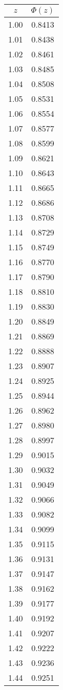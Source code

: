 \begin{tabular}{|c|c|}\hline
$z$ & $\Phi(z)$ \\ \hline
1.00 & 0.8413\\
1.01 & 0.8438\\
1.02 & 0.8461\\
1.03 & 0.8485\\
1.04 & 0.8508\\
1.05 & 0.8531\\
1.06 & 0.8554\\
1.07 & 0.8577\\
1.08 & 0.8599\\
1.09 & 0.8621\\
1.10 & 0.8643\\
1.11 & 0.8665\\
1.12 & 0.8686\\
1.13 & 0.8708\\
1.14 & 0.8729\\
1.15 & 0.8749\\
1.16 & 0.8770\\
1.17 & 0.8790\\
1.18 & 0.8810\\
1.19 & 0.8830\\
1.20 & 0.8849\\
1.21 & 0.8869\\
1.22 & 0.8888\\
1.23 & 0.8907\\
1.24 & 0.8925\\
1.25 & 0.8944\\
1.26 & 0.8962\\
1.27 & 0.8980\\
1.28 & 0.8997\\
1.29 & 0.9015\\
1.30 & 0.9032\\
1.31 & 0.9049\\
1.32 & 0.9066\\
1.33 & 0.9082\\
1.34 & 0.9099\\
1.35 & 0.9115\\
1.36 & 0.9131\\
1.37 & 0.9147\\
1.38 & 0.9162\\
1.39 & 0.9177\\
1.40 & 0.9192\\
1.41 & 0.9207\\
1.42 & 0.9222\\
1.43 & 0.9236\\
1.44 & 0.9251\\

\end{tabular}

